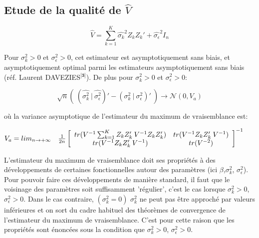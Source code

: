 \documentclass[12pt,fleqn]{book} %
\begin{document}
\subsection{Etude de la qualité de $\hat{V}$}


\vspace{1em}

\[
\hat{V}=\sum_{k=1}^{K} \hat{\sigma_k}^2 Z_k Z_k' + \hat{\sigma_{\epsilon}}^2 I_n
\]

Pour $\sigma_k^2>0$ et $\sigma_{\epsilon}^2>0$, cet estimateur est asymptotiquement sans biais, et asymptotiquement optimal parmi les estimateurs asymptotiquement sans biais (réf. Laurent DAVEZIES$^\textbf{[3]}$). De plus pour $\sigma_k^2>0$ et $\sigma_{\epsilon}^2>0$:


\[ 
\sqrt{n}\left(\:(\hat{\sigma_k^2}\:|\:\hat{\sigma_{\epsilon}^2})'-(\sigma_k^2\:|\:\sigma_{\epsilon}^2)' \:\right) \rightarrow \mathcal{N}(0,V_a)
\]

où la variance asymptotique de l'estimateur du maximum de vraisemblance est:

\vspace{1em}

$V_a =lim_{n\rightarrow +\infty}\quad\frac{1}{2n}\left[
  \begin{array}{ c c }
    tr(V^{-1} \sum_{k=1}^{K} Z_k Z_k'\:V^{-1} Z_k Z_k') & tr(V^{-1} Z_k Z_k'\:V^{-1}) \\
    tr(V^{-1} Z_k Z_k'\:V^{-1}) & tr(V^{-2})  
  \end{array} \right]^{-1}$ 
  \vspace{2em}
  
  \begin{remark}
  L’estimateur du maximum de vraisemblance doit ses propriétés à des développements
de certaines fonctionnelles autour des paramètres (ici $\beta$,$\sigma_k^2$, $\sigma_{\epsilon}^2$). Pour pouvoir faire ces développements de manière standard, il faut que le voisinage des paramètres soit suffisamment
'régulier', c’est le cas lorsque $\sigma_k^2>0$, $\sigma_{\epsilon}^2>0$. Dans le cas contraire, $(\sigma_k^2=0)$  $\sigma_k^2$ ne peut pas
être approché par valeurs inférieures et on sort du cadre habituel des théorèmes de convergence de
l’estimateur du maximum de vraisemblance. C’est pour cette raison que les propriétés sont énoncées
sous la condition que $\sigma_k^2>0$, $\sigma_{\epsilon}^2>0$.
  \end{remark}
  
  
  

\newpage
\end{document}
